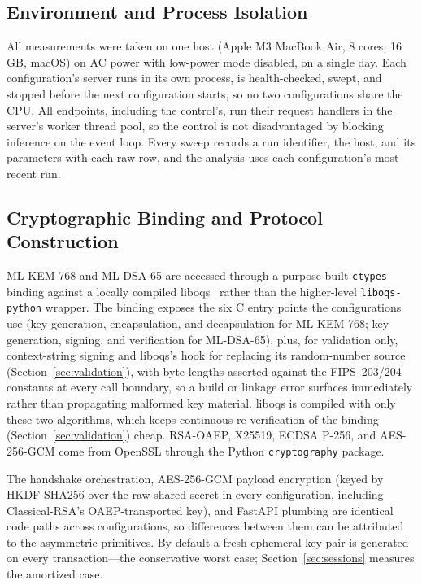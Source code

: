\documentclass[conference]{IEEEtran}
\begin{document}
\subsection{Environment and Process Isolation}
All measurements were taken on one host (Apple M3 MacBook Air, 8 cores, 16\,GB, macOS) on AC power
with low-power mode disabled, on a single day. Each configuration's server runs in its own process,
is health-checked, swept, and stopped before the next configuration starts, so no two configurations
share the CPU. All endpoints, including the control's, run their request handlers in the server's
worker thread pool, so the control is not disadvantaged by blocking inference on the event loop.
Every sweep records a run identifier, the host, and its parameters with each raw row, and the
analysis uses each configuration's most recent run.

\subsection{Cryptographic Binding and Protocol Construction}
ML-KEM-768 and ML-DSA-65 are accessed through a purpose-built \texttt{ctypes} binding against a
locally compiled liboqs~\cite{stebila2016oqs} rather than the higher-level \texttt{liboqs-python}
wrapper. The binding exposes the six C entry points the configurations use (key generation,
encapsulation, and decapsulation for ML-KEM-768; key generation, signing, and verification for
ML-DSA-65), plus, for validation only, context-string signing and liboqs's hook for replacing its
random-number source (Section~\ref{sec:validation}), with byte
lengths asserted against the FIPS~203/204 constants at every call boundary, so a build or linkage
error surfaces immediately rather than propagating malformed key material. liboqs is compiled with
only these two algorithms, which keeps continuous re-verification of the binding
(Section~\ref{sec:validation}) cheap. RSA-OAEP, X25519, ECDSA P-256, and AES-256-GCM come from OpenSSL
through the Python \texttt{cryptography} package.

The handshake orchestration, AES-256-GCM payload encryption (keyed by HKDF-SHA256 over the raw shared
secret in every configuration, including Classical-RSA's OAEP-transported key), and FastAPI plumbing
are identical code paths across configurations, so differences between them can be attributed to the
asymmetric primitives. By default a fresh ephemeral key pair is generated on every transaction---the
conservative worst case; Section~\ref{sec:sessions} measures the amortized case.
\end{document}
